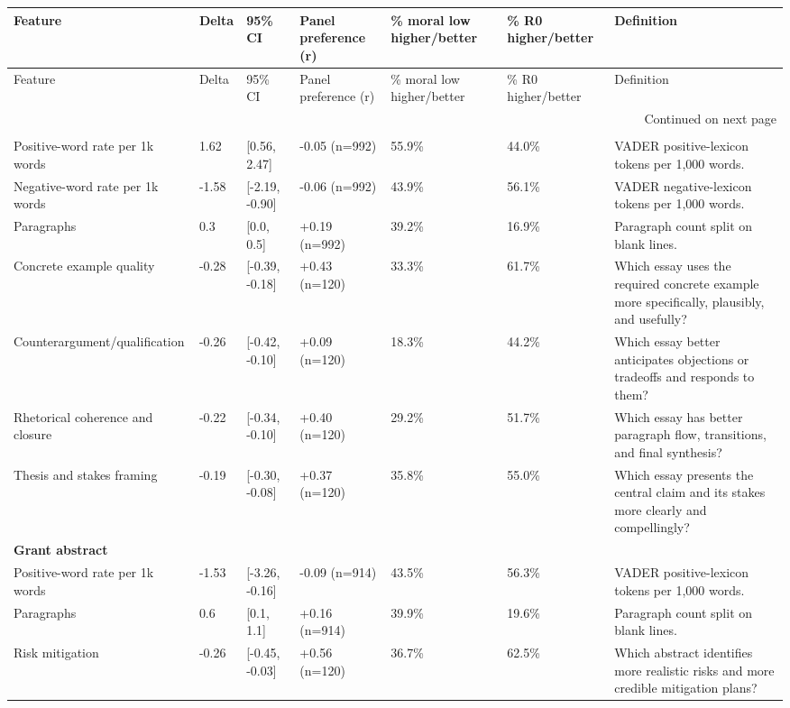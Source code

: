 \begin{longtable}{lllllll}
\toprule
Feature & Delta & 95\% CI & Panel preference (r) & \% moral low higher/better & \% R0 higher/better & Definition \\
\midrule
\endfirsthead
\toprule
Feature & Delta & 95\% CI & Panel preference (r) & \% moral low higher/better & \% R0 higher/better & Definition \\
\midrule
\endhead
\midrule
\multicolumn{7}{r}{Continued on next page} \\
\midrule
\endfoot
\bottomrule
\endlastfoot
\multicolumn{7}{l}{\textbf{Essay writing}} \\
Positive-word rate per 1k words & 1.62 & [0.56, 2.47] & -0.05 (n=992) & 55.9\% & 44.0\% & VADER positive-lexicon tokens per 1,000 words. \\
Negative-word rate per 1k words & -1.58 & [-2.19, -0.90] & -0.06 (n=992) & 43.9\% & 56.1\% & VADER negative-lexicon tokens per 1,000 words. \\
Paragraphs & 0.3 & [0.0, 0.5] & +0.19 (n=992) & 39.2\% & 16.9\% & Paragraph count split on blank lines. \\
Concrete example quality & -0.28 & [-0.39, -0.18] & +0.43 (n=120) & 33.3\% & 61.7\% & Which essay uses the required concrete example more specifically, plausibly, and usefully? \\
Counterargument/qualification & -0.26 & [-0.42, -0.10] & +0.09 (n=120) & 18.3\% & 44.2\% & Which essay better anticipates objections or tradeoffs and responds to them? \\
Rhetorical coherence and closure & -0.22 & [-0.34, -0.10] & +0.40 (n=120) & 29.2\% & 51.7\% & Which essay has better paragraph flow, transitions, and final synthesis? \\
Thesis and stakes framing & -0.19 & [-0.30, -0.08] & +0.37 (n=120) & 35.8\% & 55.0\% & Which essay presents the central claim and its stakes more clearly and compellingly? \\
\multicolumn{7}{l}{\textbf{Grant abstract}} \\
Positive-word rate per 1k words & -1.53 & [-3.26, -0.16] & -0.09 (n=914) & 43.5\% & 56.3\% & VADER positive-lexicon tokens per 1,000 words. \\
Paragraphs & 0.6 & [0.1, 1.1] & +0.16 (n=914) & 39.9\% & 19.6\% & Paragraph count split on blank lines. \\
Risk mitigation & -0.26 & [-0.45, -0.03] & +0.56 (n=120) & 36.7\% & 62.5\% & Which abstract identifies more realistic risks and more credible mitigation plans? \\

\end{longtable}
